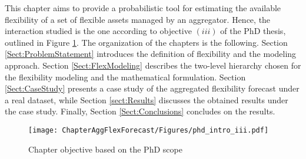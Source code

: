 This chapter aims to provide a probabilistic tool for estimating the available flexibility of a set of flexible assets managed by an aggregator. Hence, the interaction studied is the one according to objective $(iii)$ of the PhD thesis, outlined in Figure \ref{fig:chapter_obj_iii}. The organization of the chapters is the following. Section \ref{Sect:ProblemStatement} introduces the definition of flexibility and the modeling approach. Section \ref{Sect:FlexModeling} describes the two-level hierarchy chosen for the flexibility modeling and the mathematical formulation. Section \ref{Sect:CaseStudy} presents a case study of the aggregated flexibility forecast under a real dataset, while Section \ref{sect:Results} discusses the obtained results under the case study. Finally, Section \ref{Sect:Conclusions} concludes on the results.

\begin{figure}[h]
	\centering
	\texttt{[image: ChapterAggFlexForecast/Figures/phd\_intro\_iii.pdf]}
		\caption{Chapter objective based on the PhD scope}
	\label{fig:chapter_obj_iii}  
\end{figure}

